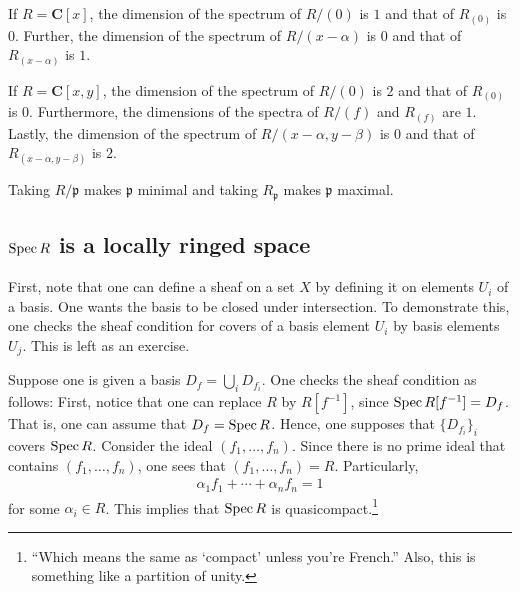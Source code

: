 \documentclass [11 pt, oneside, margin = 1 in] {article}
\begin{document}
\begin{remark}
	If $R=\mathbf{C}[x]$, the dimension of the spectrum of $R/(0)$ is $1$ and that of $R_{(0)}$ is $0$. Further, the dimension of the spectrum of $R/(x-\alpha)$ is $0$ and that of $R_{(x-\alpha) }$ is $1$.

	If $R=\mathbf{C}[x,y]$, the dimension of the spectrum of $R/(0)$ is $2$ and that of $R_{(0)}$ is $0$. Furthermore, the dimensions of the spectra of $R/(f)$ and $R_{(f)}$ are $1$. Lastly, the dimension of the spectrum of $R/(x-\alpha, y-\beta)$ is $0$ and that of $R_{(x-\alpha,y-\beta)}$ is $2$. 
\end{remark}

\begin{remark}
	Taking $R/\mathfrak{p}$ makes $\mathfrak{p}$ minimal and taking $R_{\mathfrak{p}}$ makes $\mathfrak{p}$ maximal.
\end{remark}

\subsection{$\operatorname{Spec} R$ is a locally ringed space}
First, note that one can define a sheaf on a set $X$ by defining it on elements $U_i$ of a basis. One wants the basis to be closed under intersection. To demonstrate this, one checks the sheaf condition for covers of a basis element $U_i$ by basis elements $U_j$. This is left as an exercise.

Suppose one is given a basis $D_f = \bigcup_ i D_{f_i}$. One checks the sheaf condition as follows: First, notice that one can replace $R$ by $R[f^{-1}]$, since $\operatorname{Spec} R[f^{-1}]= D_f$. That is, one can assume that $D_f = \operatorname{Spec} R$. Hence, one supposes that $\{D_{f_i}\}_i$ covers $\operatorname{Spec} R$. Consider the ideal $(f_1,\hdots, f_n)$. Since there is no prime ideal that contains $(f_1,\hdots, f_n)$, one sees that $(f_1,\hdots, f_n)=R$. Particularly, 
\begin{align*}
	\alpha_1f_1 + \cdots +\alpha_nf_n = 1
\end{align*}
for some $\alpha_i\in R$. This implies that $\operatorname{Spec} R$ is quasicompact.\footnote{``Which means the same as `compact' unless you're French.'' Also, this is something like a partition of unity.}
\end{document}
